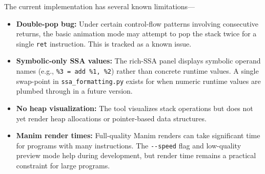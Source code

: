 The current implementation has several known limitations---

\begin{itemize}
    \item \textbf{Double-pop bug:} Under certain control-flow patterns involving consecutive returns, the basic animation mode may attempt to pop the stack twice for a single \texttt{ret} instruction. This is tracked as a known issue.

    \item \textbf{Symbolic-only SSA values:} The rich-SSA panel displays symbolic operand names (e.g., \texttt{\%3 = add \%1, \%2}) rather than concrete runtime values. A single swap-point in \texttt{ssa\_formatting.py} exists for when numeric runtime values are plumbed through in a future version.

    \item \textbf{No heap visualization:} The tool visualizes stack operations but does not yet render heap allocations or pointer-based data structures.

    \item \textbf{Manim render times:} Full-quality Manim renders can take significant time for programs with many instructions. The \texttt{-{}-speed} flag and low-quality preview mode help during development, but render time remains a practical constraint for large programs.
\end{itemize}
